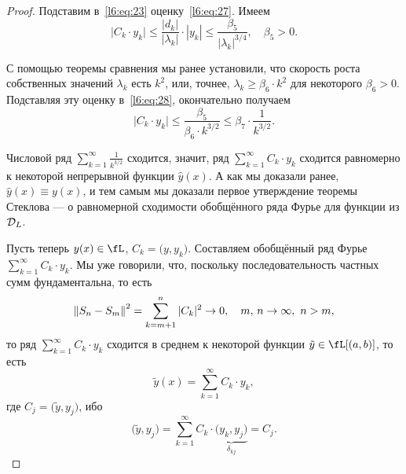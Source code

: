 \begin{proof}
	\noindent Подставим в~\eqref{l6:eq:23} оценку~\eqref{l6:eq:27}. Имеем 
	\begin{equation}
		\label{l6:eq:28}
		\big|C_k\cdot y_k\big|\leqslant\frac{|d_k|}{|\lambda_k|}\cdot|y_k|\leqslant\frac{\beta_5}{|\lambda_k|^{3/4}},\quad\beta_5>0.
	\end{equation}
	
	С помощью теоремы сравнения мы ранее установили, что скорость роста собственных значений $\lambda_k$ есть $k^2$, или{\mb,} точнее, $\lambda_k\geqslant\beta_6\cdot k^2$ для некоторого $\beta_6>0$. Подставляя эту оценку в~\eqref{l6:eq:28}{\mb,} окончательно получаем 
	\begin{equation}
		\big|C_k\cdot y_k\big|\leqslant\frac{\beta_5}{\beta_6\cdot k^{3/2}}\leqslant\beta_7\cdot\frac{1}{k^{3/2}}.
	\end{equation}
	
	Числовой ряд $\sum\limits_{k=1}^{\infty}\frac{\textstyle1}{\textstyle k^{3/2}}$ сходится, значит{\mb,} ряд $\sum\limits_{k=1}^{\infty}C_k\cdot y_k$ сходится равномерно к некоторой непрерывной функции $\hat{y}(x)$. А как мы доказали ранее, $\hat{y}(x)\equiv y(x)${\mb,} и тем самым мы доказали первое утверждение теоремы Стеклова --- о равномерной сходимости обобщённого ряда Фурье для функции из $\mathcal{D}_L$.
	\vspace{0,2cm}
	
	Пусть теперь $y(x)\in\fL$, $C_k=\big(y,y_k\big)$. Составляем обобщённый ряд Фурье $\sum\limits_{k=1}^{\infty}C_k\cdot y_k$. Мы уже говорили, что{\mb,} поскольку последовательность частных сумм фундаментальна, то есть
	\begin{equation*}
		{\ensuremath{\left\|S_n-S_m\right\|}}^2=\sum\limits_{k=m+1}^n|C_k|^2\to0,\quad m,\,n\to\infty,\ n>m,
	\end{equation*}
	то ряд $\sum\limits_{k=1}^{\infty}C_k\cdot y_k$ сходится в среднем к некоторой функции $\tilde{y}\in\fL[(a,b)]$, то есть
	\begin{equation}
		\label{l6:eq:30}
		 \tilde{y}(x)=\sum\limits_{k=1}^{\infty}C_k\cdot y_k,
	\end{equation}
	где $C_j=\big(\tilde{y},y_j\big)$, ибо
	\begin{equation*}
		\big(\tilde{y},y_j\big)=\sum\limits_{k=1}^{\infty}C_k\cdot\underbrace{\big(y_k,y_j\big)}_{\delta_{kj}}=C_j.
	\end{equation*}
	

\end{proof}
